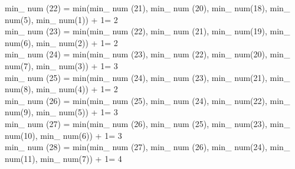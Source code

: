 \documentclass[11pt]{article}
\begin{document}
min\_ num (22) = min(min\_ num (21), min\_ num (20), min\_ num(18), min\_ num(5), min\_ num(1)) + 1= 2\\
min\_ num (23) = min(min\_ num (22), min\_ num (21), min\_ num(19), min\_ num(6), min\_ num(2)) + 1= 2\\
min\_ num (24) = min(min\_ num (23), min\_ num (22), min\_ num(20), min\_ num(7), min\_ num(3)) + 1= 3\\
min\_ num (25) = min(min\_ num (24), min\_ num (23), min\_ num(21), min\_ num(8), min\_ num(4)) + 1= 2\\
min\_ num (26) = min(min\_ num (25), min\_ num (24), min\_ num(22), min\_ num(9), min\_ num(5)) + 1= 3\\
min\_ num (27) = min(min\_ num (26), min\_ num (25), min\_ num(23), min\_ num(10), min\_ num(6)) + 1= 3\\
min\_ num (28) = min(min\_ num (27), min\_ num (26), min\_ num(24), min\_ num(11), min\_ num(7)) + 1= 4\\
\end{document}
